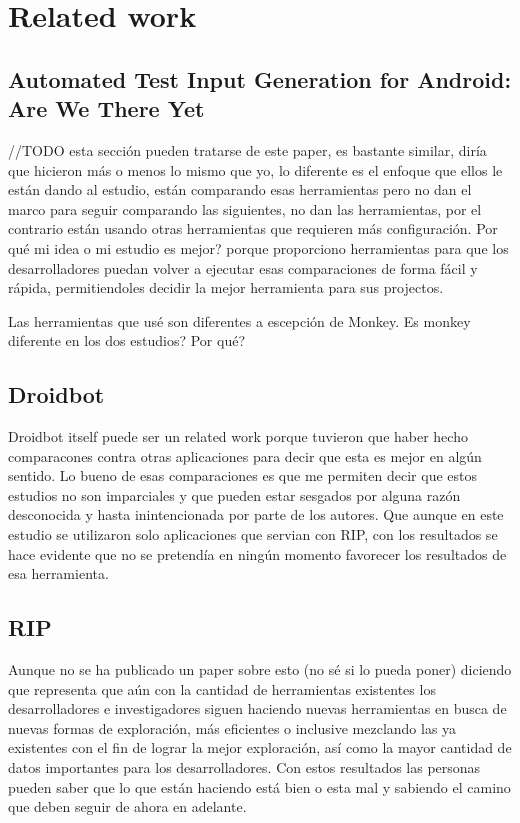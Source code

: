 
\chapter{Related work} %


\label{Chapter3} %


\section{Automated Test Input Generation for Android:
Are We There Yet}

//TODO esta sección pueden tratarse de este paper, es bastante similar, diría que hicieron más o menos lo mismo que yo, lo diferente es el enfoque que ellos le están dando al estudio, están comparando esas herramientas pero no dan el marco para seguir comparando las siguientes, no dan las herramientas, por el contrario están usando otras herramientas que requieren más configuración. 
Por qué mi idea o mi estudio es mejor? porque proporciono herramientas para que los desarrolladores puedan volver a ejecutar esas comparaciones de forma fácil y rápida, permitiendoles decidir la mejor herramienta para sus projectos.

Las herramientas que usé son diferentes a escepción de Monkey. Es monkey diferente en los dos estudios? Por qué?

\section{Droidbot}
Droidbot itself puede ser un related work porque tuvieron que haber hecho comparacones contra otras aplicaciones para decir que esta es mejor en algún sentido. Lo bueno de esas comparaciones es que me permiten decir que estos estudios no son imparciales y que pueden estar sesgados por alguna razón desconocida y hasta inintencionada por parte de los autores. Que aunque en este estudio se utilizaron solo aplicaciones que servian con RIP, con los resultados se hace evidente que no se pretendía en ningún momento favorecer los resultados de esa herramienta.

\section{RIP}
Aunque no se ha publicado un paper sobre esto (no sé si lo pueda poner) diciendo que representa que aún con la cantidad de herramientas existentes los desarrolladores e investigadores siguen haciendo nuevas herramientas en busca de nuevas formas de exploración, más eficientes o inclusive mezclando las ya existentes con el fin de lograr la mejor exploración, así como la mayor cantidad de datos importantes para los desarrolladores. Con estos resultados las personas pueden saber que lo que están haciendo está bien o esta mal y sabiendo el camino que deben seguir de ahora en adelante.

